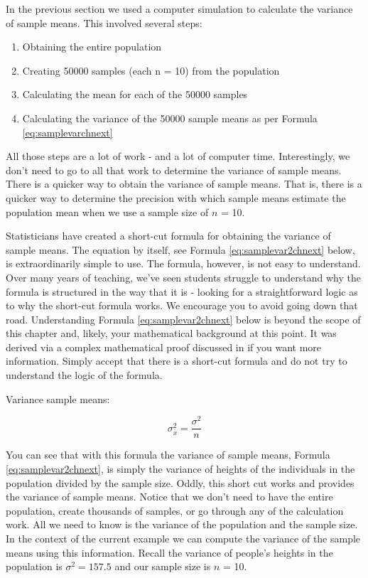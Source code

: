 \documentclass[
]{krantz}
\providecommand{\tightlist}{%
  \setlength{\itemsep}{0pt}\setlength{\parskip}{0pt}}
\begin{document}
In the previous section we used a computer simulation to calculate the variance of sample means. This involved several steps:

\begin{enumerate}
\def\labelenumi{\arabic{enumi}.}
\tightlist
\item
  Obtaining the entire population
\item
  Creating 50000 samples (each n = 10) from the population
\item
  Calculating the mean for each of the 50000 samples
\item
  Calculating the variance of the 50000 sample means as per Formula \eqref{eq:samplevarchnext}
\end{enumerate}

All those steps are a lot of work - and a lot of computer time. Interestingly, we don't need to go to all that work to determine the variance of sample means. There is a quicker way to obtain the variance of sample means. That is, there is a quicker way to determine the precision with which sample means estimate the population mean when we use a sample size of \(n\) = 10.

Statisticians have created a short-cut formula for obtaining the variance of sample means. The equation by itself, see Formula \eqref{eq:samplevar2chnext} below, is extraordinarily simple to use. The formula, however, is not easy to understand. Over many years of teaching, we've seen students struggle to understand why the formula is structured in the way that it is - looking for a straightforward logic as to why the short-cut formula works. We encourage you to avoid going down that road. Understanding Formula \eqref{eq:samplevar2chnext} below is beyond the scope of this chapter and, likely, your mathematical background at this point. It was derived via a complex mathematical proof discussed in \citet{hays1994} if you want more information. Simply accept that there is a short-cut formula and do not try to understand the logic of the formula.

Variance sample means:

\begin{equation} 
\sigma_{\bar{x}}^2 = \frac{\sigma^2}{n}
      \label{eq:samplevar2chnext}
\end{equation}

You can see that with this formula the variance of sample means, Formula \eqref{eq:samplevar2chnext}, is simply the variance of heights of the individuals in the population divided by the sample size. Oddly, this short cut works and provides the variance of sample means. Notice that we don't need to have the entire population, create thousands of samples, or go through any of the calculation work. All we need to know is the variance of the population and the sample size. In the context of the current example we can compute the variance of the sample means using this information. Recall the variance of people's heights in the population is \(\sigma^2=157.5\) and our sample size is \(n\) = 10.
\end{document}
